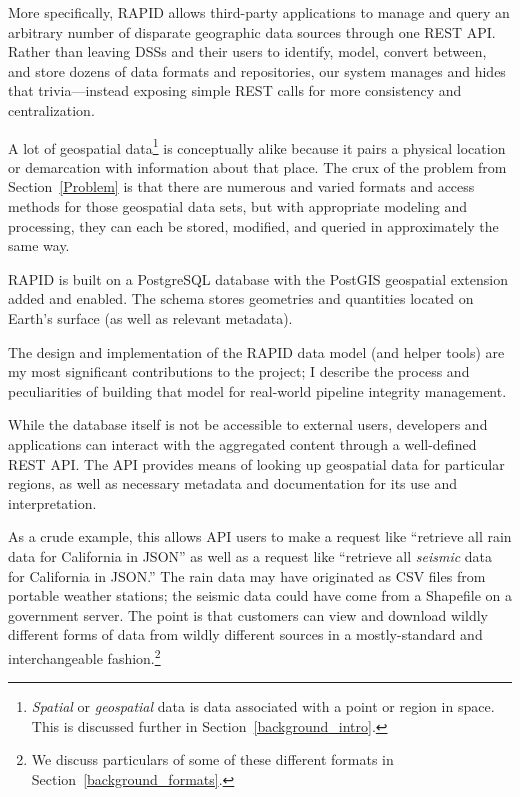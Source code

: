 More specifically, RAPID allows third-party applications to manage and query an arbitrary number of disparate geographic data sources through one REST API. Rather than leaving DSSs and their users to identify, model, convert between, and store dozens of data formats and repositories, our system manages and hides that trivia---instead exposing simple REST calls for more consistency and centralization.

A lot of geospatial data\footnote{\textit{Spatial} or \textit{geospatial} data is data associated with a point or region in space. This is discussed further in Section~\ref{background_intro}.} is conceptually alike because it pairs a physical location or demarcation with information about that place. The crux of the problem from Section~\ref{Problem} is that there are numerous and varied formats and access methods for those geospatial data sets, but with appropriate modeling and processing, they can each be stored, modified, and queried in approximately the same way.

RAPID is built on a PostgreSQL database with the PostGIS geospatial extension added and enabled. The schema stores geometries and quantities located on Earth's surface (as well as relevant metadata).

The design and implementation of the RAPID data model (and helper tools) are my most significant contributions to the project; I describe the process and peculiarities of building that model for real-world pipeline integrity management.

While the database itself is not be accessible to external users, developers and applications can interact with the aggregated content through a well-defined REST API. The API provides means of looking up geospatial data for particular regions, as well as necessary metadata and documentation for its use and interpretation.

As a crude example, this allows API users to make a request like ``retrieve all rain data for California in JSON'' as well as a request like ``retrieve all \textit{seismic} data for California in JSON.'' The rain data may have originated as CSV files from portable weather stations; the seismic data could have come from a Shapefile on a government server. The point is that customers can view and download wildly different forms of data from wildly different sources in a mostly-standard and interchangeable fashion.\footnote{We discuss particulars of some of these different formats in Section~\ref{background_formats}.}

